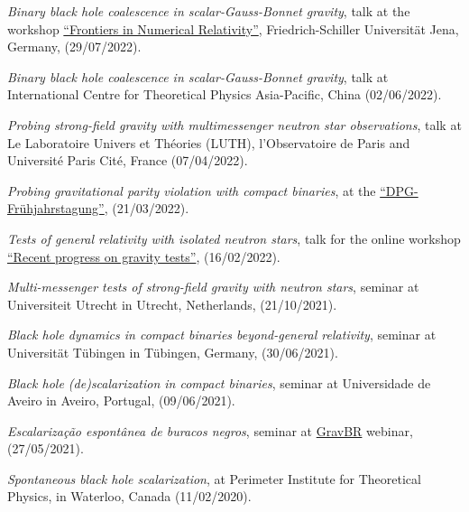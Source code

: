 \documentclass[10pt]{article}
\newcommand{\invited}{{\color{aeilbl}{invited}}}
\begin{document}
\begin{bibenum}
    \item
    \emph{Binary black hole coalescence in scalar-Gauss-Bonnet gravity},
    talk at the workshop \href{https://sites.google.com/view/fundamental-aspects-of-gravity}{``Frontiers in Numerical Relativity''}, Friedrich-Schiller Universit\"at Jena, Germany, (29/07/2022).

    \item
    \emph{Binary black hole coalescence in scalar-Gauss-Bonnet gravity},
    \invited{} talk at International Centre for Theoretical Physics Asia-Pacific,
    China
    (02/06/2022).

    \item
    \emph{Probing strong-field gravity with multimessenger neutron star observations},
    \invited{} talk at Le Laboratoire Univers et Th\'eories (LUTH), l'Observatoire de Paris and Universit\'e Paris Cit\'e,
    France
    (07/04/2022).

    \item
    \emph{Probing gravitational parity violation with compact binaries},
    at the \href{https://heidelberg22.dpg-tagungen.de/}{``DPG-Fr\"uhjahrstagung''},
    (21/03/2022).

    \item
    \emph{Tests of general relativity with isolated neutron stars},
    \invited{} talk for the online workshop \href{https://honghui-liu.github.io/gravity-test/}{``Recent progress on gravity tests''},
    (16/02/2022).

    \item
    \emph{Multi-messenger tests of strong-field gravity
    with neutron stars},
    \invited{} seminar at Universiteit Utrecht in Utrecht, Netherlands,
    (21/10/2021).

    \item
    \emph{Black hole dynamics in compact binaries beyond-general relativity},
    \invited{} seminar at Universit\"at T\"ubingen in T\"ubingen, Germany,
    (30/06/2021).

    \item
    \emph{Black hole (de)scalarization in compact binaries},
    \invited{} seminar at Universidade de Aveiro in Aveiro, Portugal,
    (09/06/2021).

    \item
    \emph{Escalariza{\c c}{\~a}o espont{\^a}nea de buracos negros},
    \invited{} seminar at \href{https://sites.google.com/view/antoniodpj/gravbr}{GravBR} webinar, (27/05/2021).

    \item
    \emph{Spontaneous black hole scalarization},
    \invited{} at Perimeter Institute for Theoretical Physics,
    in Waterloo, Canada (11/02/2020).


\end{bibenum}
\end{document}
